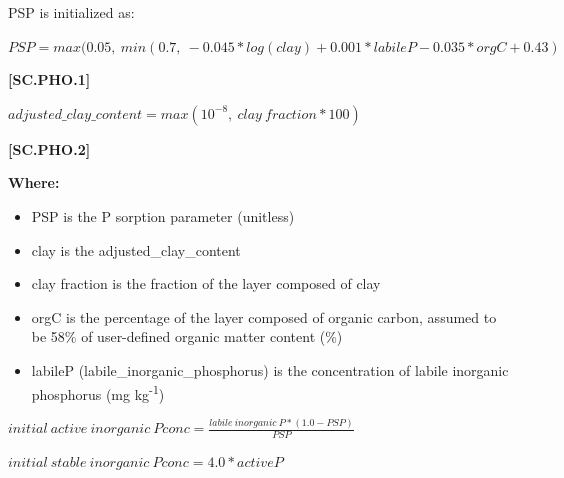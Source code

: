 PSP is initialized as:	
\vspace{0.5cm}
            
    \begin{center}
\(PSP= max(0.05,\ min(0.7,\ -0.045 * log(clay) +0.001 * labileP-0.035 * orgC+0.43)\)
    \end{center}
        \vspace{0.5cm} 
    
            {\raggedleft \textbf{[SC.PHO.1]}\par}
            \vspace{0.5cm}
            
    \begin{center}

\( adjusted\_clay\_content= max(10^{-8},\ clay\ fraction*100)\)

    \end{center}
        \vspace{0.5cm} 
    
            {\raggedleft \textbf{[SC.PHO.2]}\par}
            \vspace{0.5cm}

        \textbf{Where:}
            
        \begin{itemize}
            \item PSP is the P sorption parameter (unitless)
            \item clay is the adjusted\_clay\_content 
            \item clay fraction is the fraction of the layer composed of clay
            \item orgC is the percentage of the layer composed of organic carbon, assumed to be 58\% of user-defined organic matter content (\%)
            \item labileP (labile\_inorganic\_phosphorus) is the concentration of labile inorganic phosphorus (mg kg\textsuperscript{-1}) 
        \end{itemize}
        \vspace{0.5cm}
            
    \begin{center}
\(initial\ active\ inorganic\ Pconc=\frac{labile\ inorganic\ P * (1.0 -PSP)}{PSP}	\)
\vspace{0.1cm}

\(initial\ stable\ inorganic\ Pconc=4.0 *activeP\)

    \end{center}
        \vspace{0.5cm} 
    
